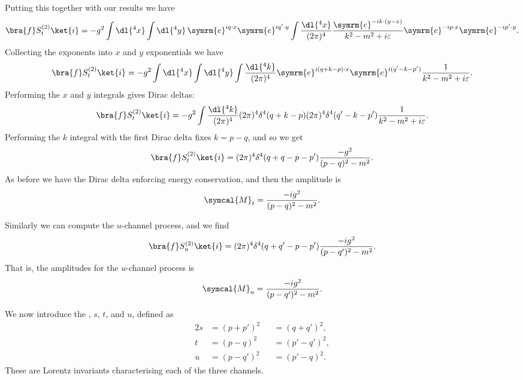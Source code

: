 \documentclass[fleqn]{NotesClass}
\newcommand{\e}{\symrm{e}}
\newcommand{\amplitude}{\symcal{M}}
\begin{document}
    Putting this together with our results we have
    \begin{equation*}
        \bra{f} S^{(2)}_{t} \ket{i} = -g^2 \int \dl{^4x} \int \dl{^4y} \, \e^{iq\cdot x} \e^{iq' \cdot y} \int \frac{\dl{^4x}}{(2\pi)^4} \frac{\e^{-ik \cdot (y - x)}}{k^2 - m^2 + i\varepsilon} \e^{-ip \cdot x} \e^{-ip' \cdot y}.
    \end{equation*}
    Collecting the exponents into \(x\) and \(y\) exponentials we have
    \begin{equation*}
        \bra{f} S^{(2)}_{t} \ket{i} = -g^2 \int \dl{^4x} \int \dl{^4y} \int \frac{\dl{^4k}}{(2\pi)^4} \e^{i(q + k - p) \cdot x} \e^{i(q' - k - p')} \frac{1}{k^2 - m^2 + i\varepsilon}.
    \end{equation*}
    Performing the \(x\) and \(y\) integrals gives Dirac deltas:
    \begin{equation*}
        \bra{f} S^{(2)}_{t} \ket{i} = -g^2 \int \frac{\dl{^4k}}{(2\pi)^4} (2\pi)^4 \delta^4(q + k - p) (2\pi)^4 \delta^4(q' - k - p') \frac{1}{k^2 - m^2 + i\varepsilon}.
    \end{equation*}
    Performing the \(k\) integral with the first Dirac delta fixes \(k = p - q\), and so we get
    \begin{equation}
        \bra{f} S^{(2)}_{t} \ket{i} = (2\pi)^4\delta^4(q + q - p - p') \frac{-g^2}{(p - q)^2 - m^2}.
    \end{equation}
    As before we have the Dirac delta enforcing energy conservation, and then the amplitude is 
    \begin{equation}
        \amplitude_t = \frac{-ig^2}{(p - q)^2 - m^2}.
    \end{equation}
    
    Similarly we can compute the \(u\)-channel process, and we find
    \begin{equation}
        \bra{f} S^{(2)}_{u} \ket{i} = (2\pi)^4 \delta^4(q + q' - p - p') \frac{-ig^2}{(p - q')^2 - m^2}.
    \end{equation}
    That is, the amplitudes for the \(u\)-channel process is
    \begin{equation}
        \amplitude_u = \frac{-ig^2}{(p - q')^2 - m^2}.
    \end{equation}
    
    We now introduce the , \(s\), \(t\), and \(u\), defined as
    \begin{alignat}{2}
        s &= (p + p')^2 &&= (q + q')^2,\\
        t &= (p - q)^2 &&= (p' - q')^2,\\
        u &= (p - q')^2 &&= (p' - q)^2.
    \end{alignat}
    These are Lorentz invariants characterising each of the three channels.
    
\end{document}
